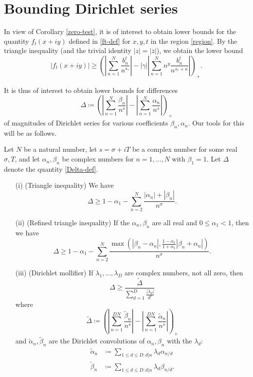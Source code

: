 \section{Bounding Dirichlet series}

In view of Corollary \ref{zero-test}, it is of interest to obtain lower bounds for the quantity $f_t(x+iy)$ defined in \eqref{ft-def}
for $x,y,t$ in the region \eqref{region}.  By the triangle inequality (and the trivial identity $|z| = |\overline{z}|$), we obtain the lower bound
$$ |f_t(x+iy)| \geq \left( \left| \sum_{n=1}^N \frac{b_n^t}{n^{s_*}}\right| - |\gamma| \left| \sum_{n=1}^N n^y \frac{b_n^t}{n^{s_* + \overline{\kappa}}} \right|\right)_+.$$

It is thus of interest to obtain lower bounds for differences
\begin{equation}\label{Delta-def}
 \Delta \coloneqq \left( \left| \sum_{n=1}^N \frac{\beta_n}{n^s}\right| - \left| \sum_{n=1}^N \frac{\alpha_n}{n^s}\right| \right)_+
\end{equation}
of magnitudes of Dirichlet series for various coefficients $\beta_n, \alpha_n$.  Our tools for this will be as follows.

\begin{lemma}\label{dirb}  Let $N$ be a natural number, let $s = \sigma+iT$ be a complex number for some real $\sigma,T$, and let $\alpha_n,\beta_n$ be complex numbers for $n=1,\dots,N$ with $\beta_1=1$.  Let $\Delta$ denote the quantity \eqref{Delta-def}.
\begin{itemize}
\item[(i)]  (Triangle inequality) We have
$$ \Delta \geq 1 - \alpha_1 - \sum_{n=2}^N \frac{|\alpha_n| + |\beta_n|}{n^\sigma}.$$
\item[(ii)]  (Refined triangle inequality) If the $\alpha_n,\beta_n$ are all real and $0 \leq \alpha_1 <1$, then we have 
$$ \Delta \geq 1 - \alpha_1 - \sum_{n=2}^N \frac{\max( |\beta_n-\alpha_n|, \frac{1-\alpha_1}{1+\alpha_1} |\beta_n+\alpha_n|)}{n^\sigma}.$$
\item[(iii)]  (Dirichlet mollifier)  If $\lambda_1,\dots,\lambda_D$ are complex numbers, not all zero, then
$$ \Delta \geq \frac{\tilde \Delta}{\sum_{d=1}^D \frac{|\lambda_d|}{d^\sigma}} $$
where
$$ \tilde \Delta \coloneqq \left( \left| \sum_{n=1}^{DN} \frac{\tilde \beta_n}{n^s}\right| - \left| \sum_{n=1}^{DN} \frac{\tilde \alpha_n}{n^s}\right| \right)_+$$
and $\tilde \alpha_n, \tilde \beta_n$ are the Dirichlet convolutions of $\alpha_n,\beta_n$ with the $\lambda_d$:
\begin{align*}
\tilde \alpha_n &\coloneqq \sum_{1 \leq d \leq D: d|n} \lambda_d \alpha_{n/d} \\
\tilde \beta_n &\coloneqq \sum_{1 \leq d \leq D: d|n} \lambda_d \beta_{n/d}.
\end{align*}
\end{itemize}
\end{lemma}

